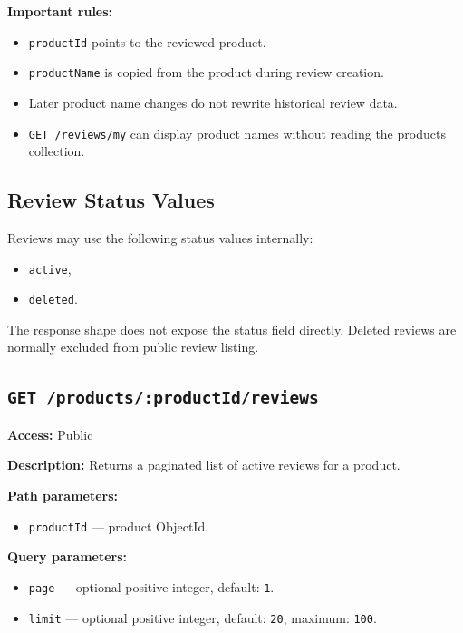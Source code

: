 \textbf{Important rules:}

\begin{itemize}
    \item \texttt{productId} points to the reviewed product.
    \item \texttt{productName} is copied from the product during review creation.
    \item Later product name changes do not rewrite historical review data.
    \item \texttt{GET /reviews/my} can display product names without reading the products collection.
\end{itemize}

\subsection{Review Status Values}

Reviews may use the following status values internally:

\begin{itemize}
    \item \texttt{active},
    \item \texttt{deleted}.
\end{itemize}

The response shape does not expose the status field directly. Deleted reviews are normally excluded from public review listing.

\subsection{\texttt{GET /products/:productId/reviews}}

\textbf{Access:} Public

\textbf{Description:} Returns a paginated list of active reviews for a product.

\textbf{Path parameters:}

\begin{itemize}
    \item \texttt{productId} --- product ObjectId.
\end{itemize}

\textbf{Query parameters:}

\begin{itemize}
    \item \texttt{page} --- optional positive integer, default: \texttt{1}.
    \item \texttt{limit} --- optional positive integer, default: \texttt{20}, maximum: \texttt{100}.
\end{itemize}

